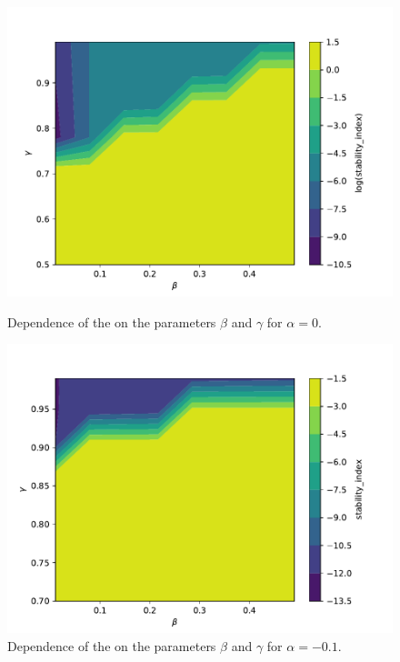 \documentclass{report}
\begin{document}
\begin{figure}[h]
\centering
\begin{minipage}[t]{0.45\textwidth}
\centering
\includegraphics[width=\textwidth]{../Plots/Project3_main/Figure_910.pdf}
\caption{Dependence of the  on the parameters $\beta$ and $\gamma$ for $\alpha=0$.}
\label{pl:beam_exp_betagamma_alpha0}
\end{minipage}
\hfill
\begin{minipage}[t]{0.45\textwidth}
\centering
\includegraphics[width=\textwidth]{../Plots/Project3_main/Figure_911.pdf}
\caption{Dependence of the  on the parameters $\beta$ and $\gamma$ for $\alpha=-0.1$.}
\label{pl:beam_exp_betagamma_alpha0.1}
\end{minipage}
\end{figure}
\end{document}
